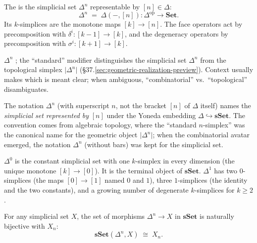 \begin{definition}
\label{def:standard-simplex}
The  is the simplicial set $\Delta^n$
representable by $[n] \in \Delta$:
\begin{equation*}
  \Delta^n \;=\; \Delta(-, [n]) : \Delta^{\mathrm{op}} \to \mathbf{Set}.
\end{equation*}
Its $k$-simplices are the monotone maps $[k] \to [n]$. The face operators
act by precomposition with $\delta^i : [k-1] \to [k]$, and the degeneracy
operators by precomposition with $\sigma^i : [k+1] \to [k]$.
\end{definition}

\begin{howtosay}
$\Delta^n$ ; the
``standard'' modifier distinguishes the simplicial set $\Delta^n$ from
the topological simplex $\lvert\Delta^n\rvert$
(\S37.\ref{sec:geometric-realization-preview}). Context usually makes
which is meant clear; when ambiguous, ``combinatorial'' vs.\ ``topological''
disambiguates.
\end{howtosay}

\begin{nameorigin}
The notation $\Delta^n$ (with superscript $n$, not the bracket $[n]$ of
$\Delta$ itself) names the \emph{simplicial set represented by} $[n]$
under the Yoneda embedding $\Delta \hookrightarrow \mathbf{sSet}$. The
convention comes from algebraic topology, where the ``standard
$n$-simplex'' was the canonical name for the geometric object
$\lvert\Delta^n\rvert$; when the combinatorial avatar emerged, the
notation $\Delta^n$ (without bars) was kept for the simplicial set.
\end{nameorigin}

\begin{example_thm}
$\Delta^0$ is the constant simplicial set with one $k$-simplex in every
dimension (the unique monotone $[k] \to [0]$). It is the terminal object
of $\mathbf{sSet}$. $\Delta^1$ has two $0$-simplices (the maps $[0] \to
[1]$ named $0$ and $1$), three $1$-simplices (the identity and the two
constants), and a growing number of degenerate $k$-simplices for $k \geq 2$.
\end{example_thm}

\begin{lemma}
\label{lem:yoneda-sset}
For any simplicial set $X$, the set of morphisms $\Delta^n \to X$ in
$\mathbf{sSet}$ is naturally bijective with $X_n$:
\begin{equation*}
  \mathbf{sSet}(\Delta^n, X) \;\cong\; X_n.
\end{equation*}
\end{lemma}

